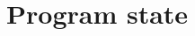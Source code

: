 \documentclass[a4paper,11pt]{report}
\begin{document}
\chapter{Program state}
    
%    
%    
%    
%    
%    
%    
%    
%    
%    
%    
%    
\end{document}
